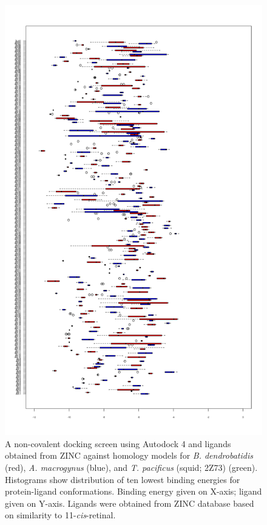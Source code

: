 \begin{figure}[hb]
  \centering
  \includegraphics[]{./Chapter_RhodStruct/img/dockPlot.png}
  \caption[Docking screen for \textit{Bd} and \textit{Am} models]{A non-covalent docking screen using Autodock 4 and ligands obtained from ZINC against homology models for \textit{B. dendrobatidis} (red), \textit{A. macrogynus} (blue), and \textit{T. pacificus} (squid; 2Z73) (green). Histograms show distribution of ten lowest binding energies for protein-ligand conformations. Binding energy given on X-axis; ligand given on Y-axis. Ligands were obtained from ZINC database based on similarity to 11-\textit{cis}-retinal.}
  \label{fig:ChRhodS_NonCovDock}
\end{figure}

